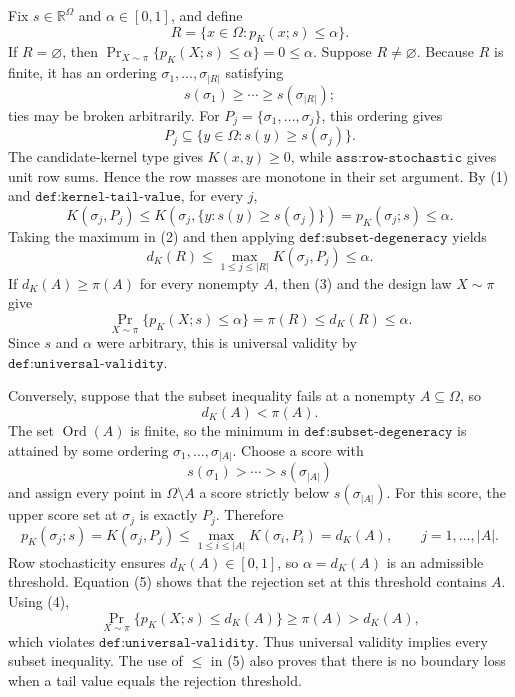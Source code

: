 Fix \(s\in\mathbb R^{\Omega}\) and \(\alpha\in[0,1]\), and define
\[
R=\{x\in\Omega:p_K(x;s)\leq\alpha\}.
\]
If \(R=\varnothing\), then
\(\Pr_{X\sim\pi}\{p_K(X;s)\leq\alpha\}=0\leq\alpha\).  Suppose
\(R\neq\varnothing\).  Because \(R\) is finite, it has an ordering
\(\sigma_1,\ldots,\sigma_{|R|}\) satisfying
\[
s(\sigma_1)\geq\cdots\geq s(\sigma_{|R|});
\]
ties may be broken arbitrarily.  For
\(P_j=\{\sigma_1,\ldots,\sigma_j\}\), this ordering gives
\[
P_j\subseteq\{y\in\Omega:s(y)\geq s(\sigma_j)\}.
\tag{1}
\]
The candidate-kernel type gives \(K(x,y)\geq0\), while
\(\texttt{ass:row-stochastic}\) gives unit row sums.  Hence the row masses are
monotone in their set argument.  By (1) and
\(\texttt{def:kernel-tail-value}\), for every \(j\),
\[
K(\sigma_j,P_j)
\leq K\!\left(\sigma_j,\{y:s(y)\geq s(\sigma_j)\}\right)
=p_K(\sigma_j;s)
\leq\alpha.
\tag{2}
\]
Taking the maximum in (2) and then applying
\(\texttt{def:subset-degeneracy}\) yields
\[
d_K(R)
\leq\max_{1\leq j\leq |R|}K(\sigma_j,P_j)
\leq\alpha.
\tag{3}
\]
If \(d_K(A)\geq\pi(A)\) for every nonempty \(A\), then (3) and the design
law \(X\sim\pi\) give
\[
\Pr_{X\sim\pi}\{p_K(X;s)\leq\alpha\}
=\pi(R)
\leq d_K(R)
\leq\alpha.
\]
Since \(s\) and \(\alpha\) were arbitrary, this is universal validity by
\(\texttt{def:universal-validity}\).

Conversely, suppose that the subset inequality fails at a nonempty
\(A\subseteq\Omega\), so
\[
d_K(A)<\pi(A).
\tag{4}
\]
The set \(\operatorname{Ord}(A)\) is finite, so the minimum in
\(\texttt{def:subset-degeneracy}\) is attained by some ordering
\(\sigma_1,\ldots,\sigma_{|A|}\).  Choose a score with
\[
s(\sigma_1)>\cdots>s(\sigma_{|A|})
\]
and assign every point in \(\Omega\setminus A\) a score strictly below
\(s(\sigma_{|A|})\).  For this score, the upper score set at \(\sigma_j\) is
exactly \(P_j\).  Therefore
\[
p_K(\sigma_j;s)
=K(\sigma_j,P_j)
\leq\max_{1\leq i\leq |A|}K(\sigma_i,P_i)
=d_K(A),
\qquad j=1,\ldots,|A|.
\tag{5}
\]
Row stochasticity ensures \(d_K(A)\in[0,1]\), so
\(\alpha=d_K(A)\) is an admissible threshold.  Equation (5) shows that the
rejection set at this threshold contains \(A\).  Using (4),
\[
\Pr_{X\sim\pi}\{p_K(X;s)\leq d_K(A)\}
\geq\pi(A)
>d_K(A),
\]
which violates \(\texttt{def:universal-validity}\).  Thus universal validity
implies every subset inequality.  The use of \(\leq\) in (5) also proves that
there is no boundary loss when a tail value equals the rejection threshold.

